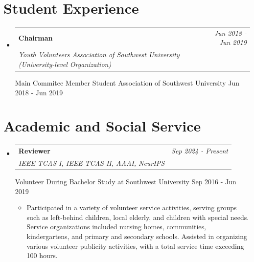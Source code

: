 \documentclass[a4paper,11pt]{article}
\makeatletter
\newcommand{\resumeProject}[4]{
\vspace{0.5mm}\item
    \begin{tabular*}{0.98\textwidth}[t]{l@{\extracolsep{\fill}}r}
        \textbf{#1} & \textit{\footnotesize{#3}} \\
        \footnotesize{\textit{#2}} & \footnotesize{#4}
    \end{tabular*}
    \vspace{-2.4mm}
}
\newcommand{\resumeSubHeadingListStart}{\begin{itemize}[leftmargin=*,labelsep=1mm]}
\newcommand{\resumeItemListStart}{\begin{itemize}[leftmargin=*,labelsep=1mm,itemsep=0.5mm]}
\newcommand{\resumeSubHeadingListEnd}{\end{itemize}\vspace{2mm}}
\newcommand{\resumeItemListEnd}{\end{itemize}\vspace{-2mm}}
\makeatother
\begin{document}
\section{\textbf{Student Experience}}
\vspace{-0.4mm}
\resumeSubHeadingListStart

\resumeProject
{Chairman}
{Youth Volunteers Association of Southwest University (University-level Organization)}
{Jun 2018 - Jun 2019}

\resumeProject
{Main Commitee Member}
{Student Association of Southwest University}
{Jun 2018 - Jun 2019}

\resumeSubHeadingListEnd



\section{\textbf{Academic and Social Service}}
\vspace{-0.4mm}
\resumeSubHeadingListStart

\resumeProject
  {Reviewer}
  {IEEE TCAS-I, IEEE TCAS-II, AAAI, NeurIPS}
  {Sep 2024 - Present}

\resumeProject
  {Volunteer}
  {During Bachelor Study at Southwest University}
  {Sep 2016 - Jun 2019}
  
\resumeItemListStart
  \item Participated in a variety of volunteer service activities, serving groups such as left-behind children, local elderly, and children with special needs. Service organizations included nursing homes, communities, kindergartens, and primary and secondary schools. Assisted in organizing various volunteer publicity activities, with a total service time exceeding 100 hours.
\resumeItemListEnd

\resumeSubHeadingListEnd
\end{document}
